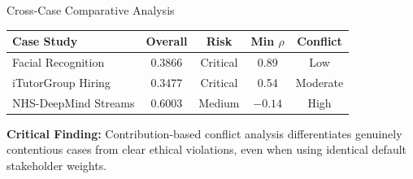 \begin{frame}{Cross-Case Comparative Analysis}
    \centering
    \setlength{\tabcolsep}{4pt}
    \begin{tabular}{l c c c c}
        \toprule
        \textbf{Case Study} & \textbf{Overall} & \textbf{Risk} & \textbf{Min $\rho$} & \textbf{Conflict} \\
        \midrule
        Facial Recognition   & 0.3866 & Critical & 0.89  & Low \\
        iTutorGroup Hiring   & 0.3477 & Critical & 0.54  & Moderate \\
        NHS-DeepMind Streams & 0.6003 & Medium   & $-0.14$ & High \\
        \bottomrule
    \end{tabular}

    \vspace{8pt}
    {\small \textbf{Critical Finding:} Contribution-based conflict analysis differentiates genuinely contentious cases from clear ethical violations, even when using identical default stakeholder weights.}
\end{frame}

